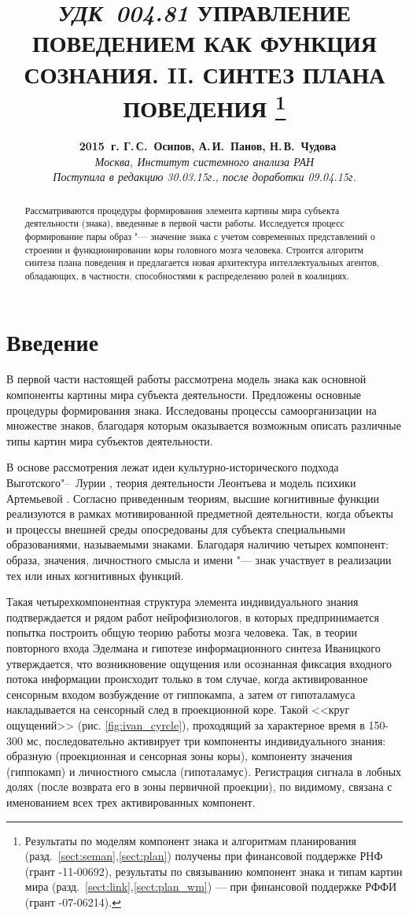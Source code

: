 \documentclass[a4paper, 12pt]{article}
\title{
	\hbox{\normalsize\textit{УДК 004.81}}
	\hbox{}\textbf{\Large\MakeUppercase{Управление поведением как функция сознания. II. Синтез плана поведения}}
	\footnote{Результаты по моделям компонент знака и алгоритмам планирования (разд.~\ref{sect:seman},\ref{sect:plan}) получены при финансовой поддержке РНФ (грант \textnumero 14-11-00692), результаты по связыванию компонент знака и типам картин мира (разд.~\ref{sect:link},\ref{sect:plan_wm}) --- при финансовой поддержке РФФИ (грант \textnumero 15-07-06214).}
}
\author{
	\textbf{\textcopyright~2015~г. Г.\,С.~Осипов, А.\,И.~Панов, Н.\,В.~Чудова}\\
	\normalsize\textit{Москва, Институт системного анализа РАН}\\
	\normalsize\textit{Поступила в редакцию 30.03.15г., после доработки 09.04.15г.}
}
\date{}
\theoremstyle{break}
\numberwithin{equation}{section}
\begin{document}
	\vspace*{-5\baselineskip}			%
	{\let\newpage\relax\maketitle}
	\vspace*{0.2\baselineskip}
	\begin{abstract}
		\noindent Рассматриваются процедуры формирования элемента картины мира субъекта деятельности (знака), введенные в первой части работы. Исследуется процесс формирование пары образ "--- значение знака с учетом современных представлений о строении и функционировании коры головного мозга человека. Строится алгоритм синтеза плана поведения и предлагается новая архитектура интеллектуальных агентов, обладающих, в частности, способностями к распределению ролей в коалициях.
	\end{abstract}	
	
	\section*{\indent Введение}
	В первой части настоящей работы \cite{PanovA2014a} рассмотрена модель знака как основной компоненты картины мира субъекта деятельности. Предложены основные процедуры формирования знака. Исследованы процессы самоорганизации на множестве знаков, благодаря которым оказывается возможным описать различные типы картин мира субъектов деятельности.
	
	В основе рассмотрения лежат идеи культурно-исторического подхода Выготского"--~Лурии \cite{Luria1970,Vygotsky2005}, теория деятельности Леонтьева \cite{Leontiev1975} и модель психики Артемьевой \cite{Artemyeva1980}. Согласно приведенным теориям, высшие когнитивные функции реализуются в рамках мотивированной предметной деятельности, когда объекты и процессы внешней  среды опосредованы для субъекта специальными образованиями, называемыми знаками. Благодаря наличию четырех компонент: образа, значения, личностного смысла и имени "--- знак участвует в реализации тех или иных когнитивных функций. 
	
	Такая четырехкомпонентная структура элемента индивидуального знания подтверждается и рядом работ нейрофизиологов, в которых предпринимается попытка построить общую теорию работы мозга человека. Так, в теории повторного входа Эделмана \cite{Edelmen1981} и гипотезе информационного синтеза Иваницкого \cite{Ivanitsky1996,Ivanitsky2010} утверждается, что возникновение ощущения или осознанная фиксация входного потока информации происходит только в том случае, когда активированное сенсорным входом возбуждение от гиппокампа, а затем от гипоталамуса накладывается на сенсорный след в проекционной коре. Такой <<круг ощущений>> \cite{Aleksandrov2007} (рис. \ref{fig:ivan_cyrcle}), проходящий за характерное время в 150-300 мс, последовательно активирует три компоненты индивидуального знания: образную (проекционная и сенсорная зоны коры), компоненту значения (гиппокамп) и личностного смысла (гипоталамус). Регистрация сигнала в лобных долях (после возврата его в зоны первичной проекции), по видимому, связана с именованием всех трех активированных компонент.
	
\end{document}
